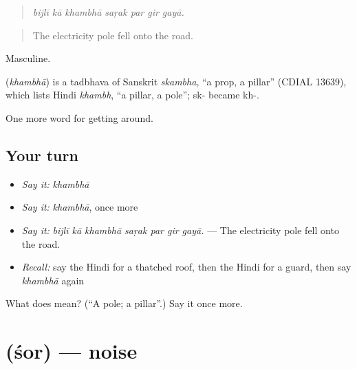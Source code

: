 \begin{quote}
      
\end{quote}

\begin{quote}
\emph{bijlī kā khambhā saṛak par gir gayā.}
\end{quote}

\begin{quote}
The electricity pole fell onto the road.
\end{quote}

Masculine.

\begin{cousinweb}
\textbf{} (\emph{khambhā}) is a tadbhava of Sanskrit \emph{skambha}, \textquotedblleft{}a prop, a pillar\textquotedblright{} (CDIAL 13639), which lists Hindi \emph{khambh}, \textquotedblleft{}a pillar, a pole\textquotedblright{}; sk- became kh-.
\end{cousinweb}

\begin{grammarlens}[title={What you've built}]
One more word for getting around.
\end{grammarlens}

\subsection*{Your turn}
\begin{itemize}
\raggedright
  \item \emph{Say it:} \emph{khambhā}
  \item \emph{Say it:} \emph{khambhā}, once more
  \item \emph{Say it:} \emph{bijlī kā khambhā saṛak par gir gayā.} — The electricity pole fell onto the road.
  \item \emph{Recall:} say the Hindi for a thatched roof, then the Hindi for a guard, then say \emph{khambhā} again
\end{itemize}

\begin{tcolorbox}[breakable,colback=teal!4,colframe=teal!35!black,title={Before you move on}]
What does  mean? (\textquotedblleft{}A pole; a pillar\textquotedblright{}.) Say it once more.
\end{tcolorbox}
\section[\texorpdfstring{\hi{शोर} (śor)}{शोर (śor)}]{ (śor) — noise}

